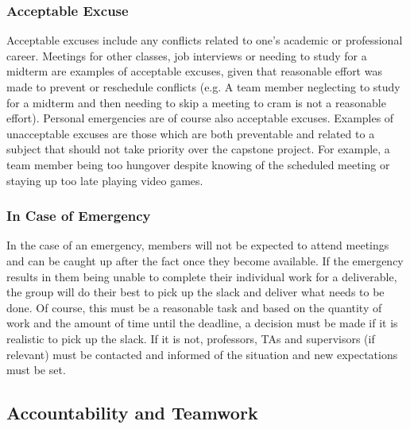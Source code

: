 \documentclass{article}
\begin{document}
\subsubsection*{Acceptable Excuse}


\par{Acceptable excuses include any conflicts related to one's academic or professional career. Meetings for other classes, job interviews or
needing to study for a midterm are examples of acceptable excuses, given that reasonable effort was made to prevent or reschedule conflicts (e.g. A team member
neglecting to study for a midterm and then needing to skip a meeting to cram is not a reasonable effort). Personal emergencies are of course also acceptable
excuses. Examples of unacceptable excuses are those which are both preventable and related to a subject that should not take priority over the capstone project.
For example, a team member being too hungover despite knowing of the scheduled meeting or staying up too late playing video games.}

\subsubsection*{In Case of Emergency}

\par{ In the case of an emergency, members will not be expected to attend meetings and can be caught up after the fact once they become available. 
If the emergency results in them being unable to complete their individual work for a deliverable, the group will do their best to pick up the slack
and deliver what needs to be done. Of course, this must be a reasonable task and based on the quantity of work and the amount of time until the deadline,
a decision must be made if it is realistic to pick up the slack. If it is not, professors, TAs and supervisors (if relevant) must be contacted and informed
of the situation and new expectations must be set.}


\subsection*{Accountability and Teamwork}
\end{document}
